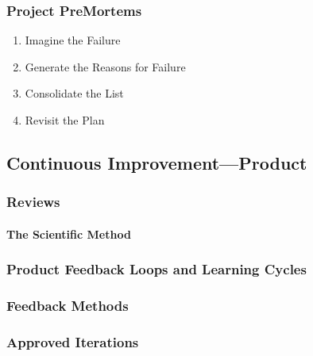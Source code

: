 \documentclass[letterpaper,10pt,english]{jupyterBook}
\begin{document}
\subsubsection{Project Pre\sphinxhyphen{}Mortems}
\label{\detokenize{APM/agile:project-pre-mortems}}\begin{enumerate}
%
\item {} 
\sphinxAtStartPar
Imagine the Failure

\item {} 
\sphinxAtStartPar
Generate the Reasons for Failure

\item {} 
\sphinxAtStartPar
Consolidate the List

\item {} 
\sphinxAtStartPar
Revisit the Plan

\end{enumerate}


\subsection{Continuous Improvement—Product}
\label{\detokenize{APM/agile:continuous-improvement-product}}

\subsubsection{Reviews}
\label{\detokenize{APM/agile:reviews}}

\paragraph{The Scientific Method}
\label{\detokenize{APM/agile:the-scientific-method}}

\subsubsection{Product Feedback Loops and Learning Cycles}
\label{\detokenize{APM/agile:product-feedback-loops-and-learning-cycles}}

\subsubsection{Feedback Methods}
\label{\detokenize{APM/agile:feedback-methods}}

\subsubsection{Approved Iterations}
\label{\detokenize{APM/agile:approved-iterations}}
\end{document}
